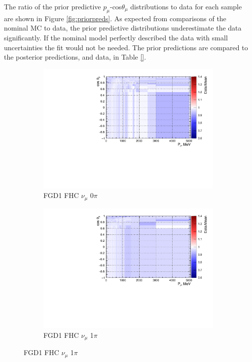 The ratio of the prior predictive $p_{\mu}$-cos$\theta_{\mu}$ distributions to data for each sample are shown in Figure \ref{fig:priorpreds}. As expected from comparisons of the nominal MC to data, the prior predictive distributions underestimate the data significantly. If the nominal model perfectly described the data with small uncertainties the fit would not be needed. The prior predictions are compared to the posterior predictions, and data, in Table \ref{}.
\begin{figure}
\centering
\begin{subfigure}{.32\textwidth}
  \centering
  \includegraphics[width=0.85\linewidth]{figs/priorpred_FGD1_numuCC_0pi.pdf}
  \caption{FGD1 FHC $\nu_{\mu}$ 0$\pi$}
  \label{fig:priorpred_FGD1_numuCC_0pi}
\end{subfigure}
\begin{subfigure}{.32\textwidth}
  \centering
  \includegraphics[width=0.85\linewidth]{figs/priorpred_FGD1_numuCC_1pi.pdf}
  \caption{FGD1 FHC $\nu_{\mu}$ 1$\pi$}
  \label{fig:priorpred_FGD1_numuCC_1pi}

\end{subfigure}
\end{figure}
